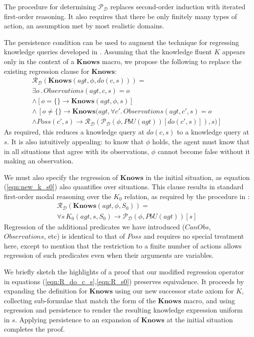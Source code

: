 \documentclass{ifaamas-submission}
\begin{document}
The procedure for determining $\mathcal{P}_{\mathcal{D}}$ replaces
second-order induction with iterated first-order reasoning. It also
requires that there be only finitely many types of action, an assumption
met by most realistic domains.

The persistence condition can be used to augment the technique for
regressing knowledge queries developed in \cite{scherl03sc_knowledge}.
Assuming that the knowledge fluent $K$ appears only in the context
of a $\mathbf{Knows}$ macro, we propose the following to replace
the existing regression clause for $\mathbf{Knows}$:\begin{multline}
\mathcal{R}_{\mathcal{D}}(\mathbf{Knows}(agt,\phi,do(c,s)))=\\
\exists o\,.\, Observations(agt,c,s)=o\\
\wedge\left[o=\{\}\rightarrow\mathbf{Knows}(agt,\phi,s)\right]\\
\wedge\,\left[o\neq\{\}\rightarrow\mathbf{Knows}(agt,\forall c'.\, Observations(agt,c',s)=o\right.\\
\left.\wedge Poss(c',s)\rightarrow\mathcal{R}_{\mathcal{D}}(\mathcal{P}_{\mathcal{D}}(\phi,PbU(agt))[do(c',s)]),s)\right]\label{eqn:R_do_c_s}\end{multline}
 As required, this reduces a knowledge query at $do(c,s)$ to a knowledge
query at $s$. It is also intuitively appealing: to know that $\phi$
holds, the agent must know that in all situations that agree with
its observations, $\phi$ cannot become false without it making an
observation.

We must also specify the regression of $\mathbf{Knows}$ in the initial
situation, as equation (\ref{eqn:new_k_s0}) also quantifies over
situations. This clause results in standard first-order modal reasoning
over the $K_{0}$ relation, as required by the procedure in \cite{scherl03sc_knowledge}:\begin{multline}
\mathcal{R}_{\mathcal{D}}(\mathbf{Knows}(agt,\phi,S_{0}))=\\
\forall s\, K_{0}(agt,s,S_{0})\rightarrow\mathcal{P}_{\mathcal{D}}(\phi,PbU(agt))[s]\label{eqn:R_s0}\end{multline}
 Regression of the additional predicates we have introduced ($CanObs$,
$Observations$, etc) is identical to that of $Poss$ and requires
no special treatment here, except to mention that the restriction
to a finite number of actions allows regression of such predicates
even when their arguments are variables.

We briefly sketch the highlights of a proof that our modified regression
operator in equations (\ref{eqn:R_do_c_s},\ref{eqn:R_s0}) preserves
equivalence. It proceeds by expanding the definition for $\mathbf{Knows}$
using our new successor state axiom for $K$, collecting sub-formulae
that match the form of the $\mathbf{Knows}$ macro, and using regression
and persistence to render the resulting knowledge expression uniform
in $s$. Applying persistence to an expansion of $\mathbf{Knows}$
at the initial situation completes the proof.
\end{document}
